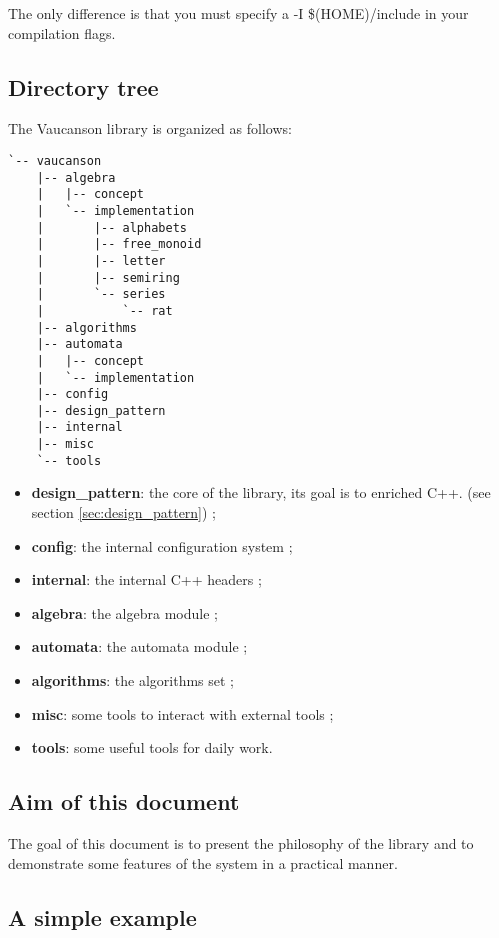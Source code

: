 \documentclass{article}
\begin{document}
The only difference is that you must specify a -I \$(HOME)/include in
your compilation flags.

\subsection{Directory tree}

The Vaucanson library is organized as follows: 

\begin{verbatim}
`-- vaucanson
    |-- algebra
    |   |-- concept
    |   `-- implementation
    |       |-- alphabets
    |       |-- free_monoid
    |       |-- letter
    |       |-- semiring
    |       `-- series
    |           `-- rat
    |-- algorithms
    |-- automata
    |   |-- concept
    |   `-- implementation
    |-- config
    |-- design_pattern
    |-- internal
    |-- misc
    `-- tools
\end{verbatim}

\begin{itemize}
\item \textbf{design_pattern}: the core of the library, its goal is to
  enriched C++. (see section \ref{sec:design_pattern}) ;

\item \textbf{config}: the internal configuration system ;
\item \textbf{internal}: the internal C++ headers ;
\item \textbf{algebra}: the algebra module ;
\item \textbf{automata}: the automata module ;
\item \textbf{algorithms}: the algorithms set ;
\item \textbf{misc}: some tools to interact with external tools ;
\item \textbf{tools}: some useful tools for daily work.
\end{itemize}

\subsection{Aim of this document}

The goal of this document is to present the philosophy of the library
and to demonstrate some features of the system in a practical manner.

\subsection{A simple example}
\end{document}

